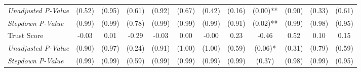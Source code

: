 \begin{tabular}{l c c c c c c c c c c c}
\quad \textit{Unadjusted P-Value} & (0.52) & (0.95) & (0.61) & (0.92) & (0.67) & (0.42) & (0.16) & (0.00)** & (0.90) & (0.33) & (0.61) \\
\quad \textit{Stepdown P-Value} & (0.99) & (0.99) & (0.78) & (0.99) & (0.99) & (0.99) & (0.91) & (0.02)** & (0.99) & (0.98) & (0.95) \\
Trust Score & -0.03 & 0.01 & -0.29 & -0.03 & 0.00 & -0.00 & 0.23 & -0.46 & 0.52 & 0.10 & 0.15 \\
\quad \textit{Unadjusted P-Value} & (0.90) & (0.97) & (0.24) & (0.91) & (1.00) & (1.00) & (0.59) & (0.06)* & (0.31) & (0.79) & (0.59) \\
\quad \textit{Stepdown P-Value} & (0.99) & (0.99) & (0.59) & (0.99) & (0.99) & (0.99) & (0.99) & (0.37) & (0.98) & (0.99) & (0.95) \\
\bottomrule
\end{tabular}
